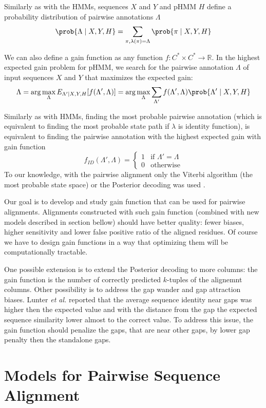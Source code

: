 Similarly as with the HMMs, sequences $X$ and $Y$ and pHMM $H$ define
a probability distribution of pairwise annotations $\Lambda$
\[\prob{\Lambda\mid X,Y,H} = \sum_{\pi,\lambda(\pi)=\Lambda}\prob{\pi\mid
X,Y,H}\]

We can also define a gain function as any function $f:C^*\times C^*\to
\mathbb{R}$. In the  highest expected gain problem for pHMM, we search for
the pairwise annotation $\Lambda$ of input sequences $X$ and $Y$ that maximizes
the expected gain:
\[\Lambda = \arg\max_{\Lambda} E_{\Lambda'\mid X,Y,H}[f(\Lambda',\Lambda)]
=  \arg\max_{\Lambda} \sum_{\Lambda'}f(\Lambda',\Lambda)\prob{\Lambda'\mid X,Y,H}\]

Similarly as with HMMs, finding the most probable pairwise annotation (which is equivalent
to finding the most probable state path if $\lambda$ is identity function),
is equivalent to finding the  pairwise annotation with the highest expected gain with
gain function
\[f_{ID}(\Lambda',\Lambda) = \begin{cases}
1 & \text{if $\Lambda'=\Lambda$}\\
0 & \text{otherwise}
\end{cases}\]
To our knowledge, with the pairwise alignment only the Viterbi algorithm (the
most probable state space) or the Posterior decoding was used
\cite{Lunter2008}.

Our goal is to develop and study gain function that can be used for pairwise
alignments. Alignments constructed with such gain function (combined with new
models described in section bellow) should have better quality: fewer biases,
higher sensitivity and lower false positive ratio of the aligned residues.
Of course we have to design gain functions in a way that optimizing them will
be computationally tractable.

One possible extension is to extend the Posterior decoding to more columns: 
the gain function is the number of correctly predicted $k$-tuples of the
alignemnt columns. Other possibility is to address the gap wander and gap attraction
biases. Lunter {\it et al.} reported that the average sequence identity near
gaps was higher then the expected value and with the distance from the gap
the expected sequence similarity lower almost to the correct value. To address
this issue, the gain function should penalize the gaps, that are near other
gaps, by lower gap penalty then the standalone gaps.


\section{Models for Pairwise Sequence Alignment}


